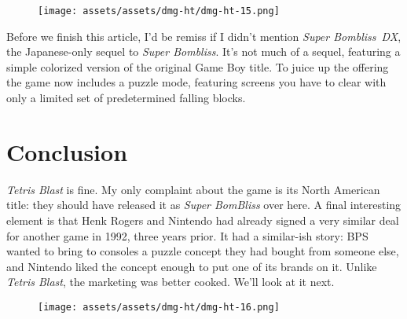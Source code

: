 \documentclass{book}
\begin{document}
\begin{figure}[hbt]
\vskip 10pt
\centering \texttt{[image: assets/assets/dmg-ht/dmg-ht-15.png]}
\vskip 6pt
\end{figure}
Before we finish this article, I’d be remiss if I didn’t mention \emph{Super Bombliss~DX}, the Japanese-only sequel to \emph{Super Bombliss}. It’s not much of a sequel, featuring a simple colorized version of the original Game Boy title. To juice up the offering the game now includes a puzzle mode, featuring screens you have to clear with only a limited set of predetermined falling blocks.

\FloatBarrier\needspace{10mm}\section*{Conclusion}\nopagebreak[4]

\emph{Tetris Blast} is fine. My only complaint about the game is its North American title: they should have released it as \emph{Super BomBliss} over here. A final interesting element is that Henk Rogers and Nintendo had already signed a very similar deal for another game in 1992, three years prior. It had a similar-ish story: BPS wanted to bring to consoles a puzzle concept they had bought from someone else, and Nintendo liked the concept enough to put one of its brands on it. Unlike \emph{Tetris Blast}, the marketing was better cooked. We’ll look at it next.

\begin{figure}[hbt]
\vskip 10pt
\centering \texttt{[image: assets/assets/dmg-ht/dmg-ht-16.png]}
\vskip 6pt
\end{figure}
\end{document}
